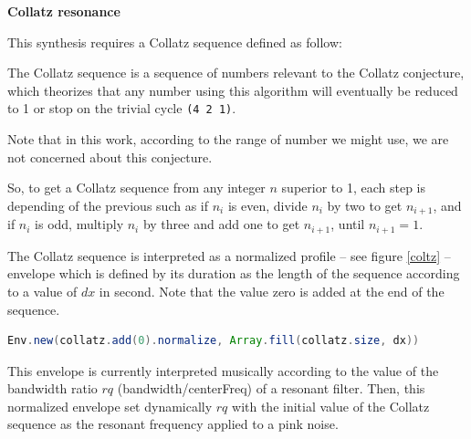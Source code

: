 \noindent \textbf{
  Collatz resonance }

\label{colres}

\smallskip
This synthesis requires a Collatz sequence defined as follow:

{The Collatz sequence is a sequence of numbers relevant to the Collatz conjecture, which theorizes that any number using this algorithm will eventually be reduced to 1 or stop on the trivial cycle \texttt{(4 2 1)}.

Note that in this work, according to the range of number we might use, we are not concerned about this conjecture.

So, to get a Collatz sequence from any integer $n$ superior to 1, each step is depending of the previous such as if $n_i$ is even, divide $n_i$ by two to get $n_{i+1}$, and if $n_i$ is odd, multiply $n_i$ by three and add one to get $n_{i+1}$, until $n_{i+1}=1$. 
} 


The Collatz sequence is interpreted as a normalized profile -- see figure \ref{coltz} -- envelope which is defined by its duration as the length of the sequence according to a value of $dx$ in second. Note that the value zero is added at the end of the sequence.
\begin{lstlisting}[basicstyle=\footnotesize\ttfamily,language=Java]
Env.new(collatz.add(0).normalize, Array.fill(collatz.size, dx))
\end{lstlisting} 


  

This envelope is currently interpreted musically according to the value of the bandwidth ratio $rq$ (bandwidth/centerFreq) of a resonant filter.  Then, this normalized envelope set dynamically $rq$ with the initial value of the Collatz sequence as the resonant frequency applied to a pink noise.

\smallskip

